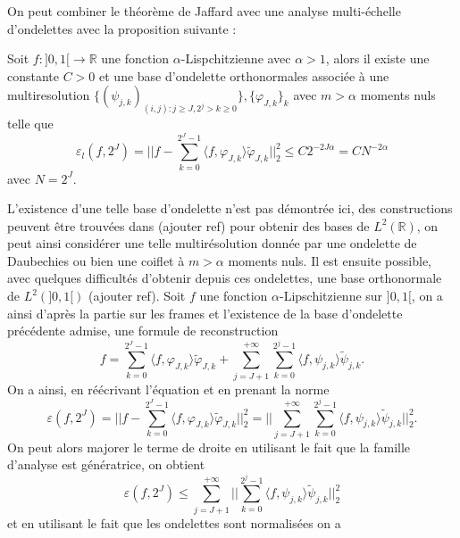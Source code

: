 On peut combiner le théorème de Jaffard avec une analyse multi-échelle d'ondelettes avec la proposition suivante :
\begin{proposition}
	Soit $f:]0,1[ \to \mathbb{R}$ une fonction $\alpha$-Lispchitzienne avec $\alpha>1$, alors il existe une constante $C>0$ et une base d'ondelette orthonormales associée à une multiresolution $\{(\psi_{j,k})_{(i,j): j\geq J, 2^{j} > k\geq 0}\}, \{\varphi_{J,k}\}_k$ avec $m>\alpha$ moments nuls telle que  
	\begin{equation}
		\varepsilon_l(f, 2^J) = ||f - \sum_{k=0}^{2^J -1} \langle f, \varphi_{J,k}\rangle \tilde{\varphi}_{J,k}||_2^2 \leq C 2^{-2J\alpha} = CN^{-2\alpha}
	\end{equation}
	avec $N=2^J$.
\end{proposition}
\begin{preuve}
	L'existence d'une telle base d'ondelette n'est pas démontrée ici, des constructions peuvent être trouvées dans (ajouter ref) pour obtenir des bases de $L^2(\mathbb{R})$, on peut ainsi considérer une telle multirésolution donnée par une ondelette de Daubechies ou bien une coiflet à $m>\alpha$ moments nuls.
	Il est ensuite possible, avec quelques difficultés d'obtenir depuis ces ondelettes, une base orthonormale de $L^2(]0,1[)$ (ajouter ref).
	Soit $f$ une fonction $\alpha$-Lipschitzienne sur $]0,1[$, on a ainsi d'après la partie sur les frames et l'existence de la base d'ondelette précédente admise, une formule de reconstruction
	\begin{equation*}
		f = \sum_{k=0}^{2^J -1} \langle f, \varphi_{J,k}\rangle \tilde{\varphi}_{J,k} + \sum_{j=J+1}^{+\infty}\sum_{k=0}^{2^j-1} \langle f, \psi_{j,k} \rangle \tilde{\psi}_{j,k}. 
	\end{equation*}
	On a ainsi, en réécrivant l'équation et en prenant la norme
	\begin{equation*}
		\varepsilon(f, 2^J) = ||f - \sum_{k=0}^{2^J -1} \langle f, \varphi_{J,k}\rangle \tilde{\varphi}_{J,k}||_2^2 =|| \sum_{j=J+1}^{+\infty}\sum_{k=0}^{2^j-1} \langle f, \psi_{j,k} \rangle \tilde{\psi}_{j,k}||_2^2. 
	\end{equation*}
	On peut alors majorer le terme de droite en utilisant le fait que la famille d'analyse est génératrice, on obtient
	\begin{equation*}
		\varepsilon(f, 2^J) \leq \sum_{j=J+1}^{+\infty} ||\sum_{k=0}^{2^j -1} \langle f, \psi_{j,k} \rangle \tilde{\psi}_{j,k} ||_2^2
	\end{equation*}
	et en utilisant le fait que les ondelettes sont normalisées on a

\end{preuve}
